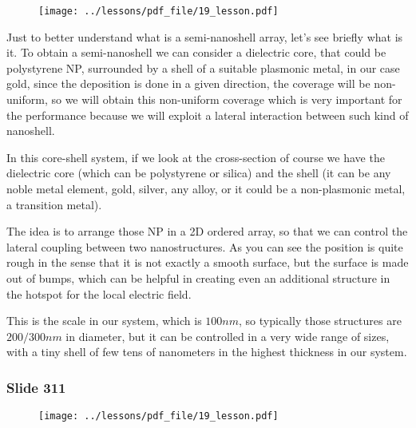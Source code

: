 \documentclass[../main/main.tex]{subfiles}
\begin{document}
\begin{figure}[h!]
\centering
\texttt{[image: ../lessons/pdf\_file/19\_lesson.pdf]}
\end{figure}

Just to better understand what is a semi-nanoshell array, let's see briefly what is it. To obtain a semi-nanoshell we can consider a dielectric core, that could be polystyrene NP, surrounded by a shell of a suitable plasmonic metal, in our case gold, since the deposition is done in a given direction, the coverage will be non-uniform, so we will obtain this non-uniform coverage which is very important for the performance because we will exploit a lateral interaction between such kind of nanoshell. 

In this core-shell system, if we look at the cross-section of course we have the dielectric core (which can be polystyrene or silica) and the shell (it can be any noble metal element, gold, silver, any alloy, or it could be a non-plasmonic metal, a transition metal). 

The idea is to arrange those NP in a 2D ordered array, so that we can control the lateral coupling between two nanostructures. As you can see the position is quite rough in the sense that it is not exactly a smooth surface, but the surface is made out of bumps, which can be helpful in creating even an additional structure in the hotspot for the local electric field. 

This is the scale in our system, which is $100 nm$, so typically those structures are  $200/300 nm$ in diameter, but it can be controlled in a very wide range of sizes, with a tiny shell of few tens of nanometers in the highest thickness in our system.

\newpage

\subsubsection{Slide 311}

\begin{figure}[h!]
\centering
\texttt{[image: ../lessons/pdf\_file/19\_lesson.pdf]}
\end{figure}
\end{document}
